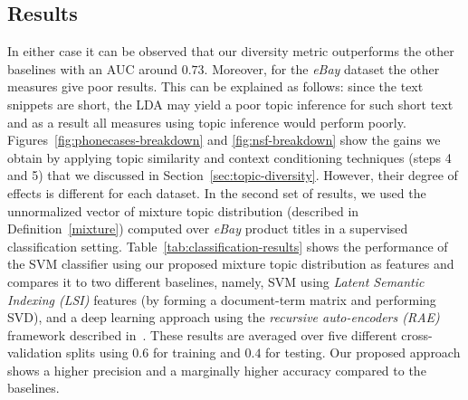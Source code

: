 \subsection{Results}
\label{sec:results}
In either case it can be observed
that our diversity metric outperforms the other baselines with an AUC
around $0.73$. Moreover, for the {\em eBay} dataset the other measures
give poor results. This can be explained as follows: since the
text snippets are short, the LDA may yield a poor topic inference for such short text and as a result all measures using topic inference would perform poorly. Figures~\ref{fig:phonecases-breakdown} and \ref{fig:nsf-breakdown} show the gains we obtain by applying topic similarity and context conditioning techniques (steps 4 and 5) that we discussed in Section~\ref{sec:topic-diversity}. However, their degree of effects is different for each
dataset.  In the second set of results, we used the unnormalized vector of mixture topic
distribution (described in Definition~\ref{mixture}) computed over
{\em eBay} product titles in a supervised classification
setting. Table~\ref{tab:classification-results} shows
the performance of the SVM classifier using our proposed mixture topic
distribution as features and compares it to two different baselines, namely, SVM using
{\em Latent Semantic Indexing (LSI)} features (by forming a
document-term matrix and performing SVD), and a deep learning approach
using the {\em recursive auto-encoders (RAE)} framework described
in~\cite{Socher:2011:SRA:2145432.2145450}. These results are averaged
over five different cross-validation splits using $0.6$ for training
and $0.4$ for testing. Our proposed approach shows a higher precision
and a marginally higher accuracy compared to the baselines.
